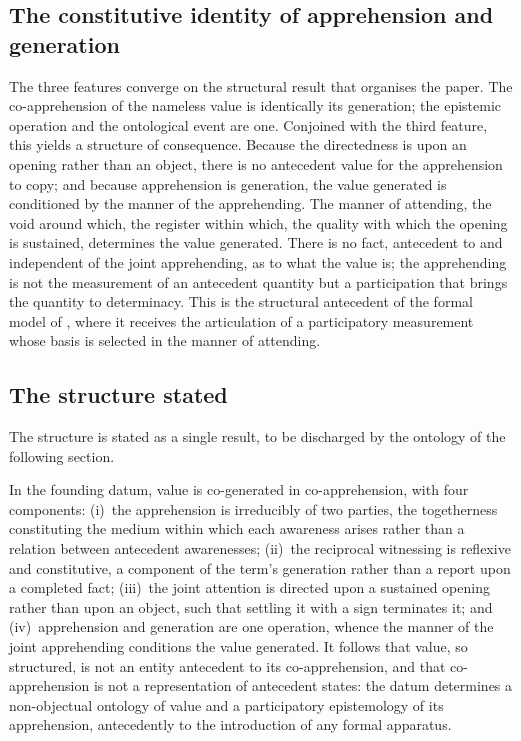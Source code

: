 \subsection{The constitutive identity of apprehension and generation}
\label{p10:sec:hinge}

The three features converge on the structural result that organises the paper. The co-apprehension of the nameless value is identically its generation; the epistemic operation and the ontological event are one. Conjoined with the third feature, this yields a structure of consequence. Because the directedness is upon an opening rather than an object, there is no antecedent value for the apprehension to copy; and because apprehension is generation, the value generated is conditioned by the manner of the apprehending. The manner of attending, the void around which, the register within which, the quality with which the opening is sustained, determines the value generated. There is no fact, antecedent to and independent of the joint apprehending, as to what the value is; the apprehending is not the measurement of an antecedent quantity but a participation that brings the quantity to determinacy. This is the structural antecedent of the formal model of , where it receives the articulation of a participatory measurement whose basis is selected in the manner of attending.

\subsection{The structure stated}
\label{p10:sec:gathered}

The structure is stated as a single result, to be discharged by the ontology of the following section.

\begin{claim}
In the founding datum, value is co-generated in co-apprehension, with four components: (i)~the apprehension is irreducibly of two parties, the togetherness constituting the medium within which each awareness arises rather than a relation between antecedent awarenesses; (ii)~the reciprocal witnessing is reflexive and constitutive, a component of the term's generation rather than a report upon a completed fact; (iii)~the joint attention is directed upon a sustained opening rather than upon an object, such that settling it with a sign terminates it; and (iv)~apprehension and generation are one operation, whence the manner of the joint apprehending conditions the value generated. It follows that value, so structured, is not an entity antecedent to its co-apprehension, and that co-apprehension is not a representation of antecedent states: the datum determines a non-objectual ontology of value and a participatory epistemology of its apprehension, antecedently to the introduction of any formal apparatus.
\end{claim}

